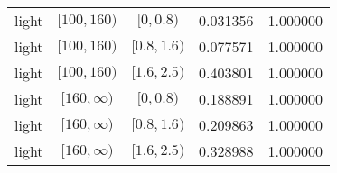 \documentclass[12pt,a4paper]{article}
\begin{document}
\begin{table}[H]
\begin{center}
\begin{tabular}{ c | c | c | c | c }
		light & $[100,160)$ & $[0,0.8)$ & 0.031356 & 1.000000 \\
		light & $[100,160)$ & $[0.8,1.6)$ & 0.077571 & 1.000000 \\
		light & $[100,160)$ & $[1.6,2.5)$ & 0.403801 & 1.000000 \\
		light & $[160,\infty)$ & $[0,0.8)$ & 0.188891 & 1.000000 \\
		light & $[160,\infty)$ & $[0.8,1.6)$ & 0.209863 & 1.000000 \\
		light & $[160,\infty)$ & $[1.6,2.5)$ & 0.328988 & 1.000000 \\ \hline
	\end{tabular}
\end{center}
\end{table}
\end{document}
